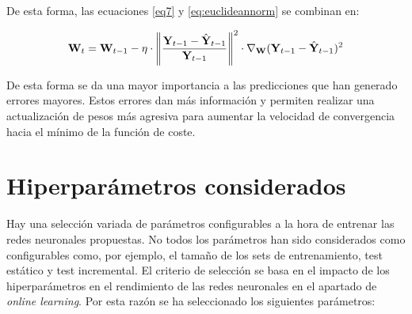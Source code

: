 De esta forma, las ecuaciones \ref{eq7} y \ref{eq:euclideannorm} se combinan en:

\begin{equation}
	\textbf{W}_t=\textbf{W}_{t-1}-\eta\cdot\norm{\frac{\textbf{Y}_{t-1}-\hat{\textbf{Y}}_{t-1}}{\textbf{Y}_{t-1}}}^2 \cdot \nabla_\textbf{W}(\textbf{Y}_{t-1}-\hat{\textbf{Y}}_{t-1})^2
\end{equation}

De esta forma se da una mayor importancia a las predicciones que han generado errores mayores. Estos errores dan más información y permiten realizar una actualización de pesos más agresiva para aumentar la velocidad de convergencia hacia el mínimo de la función de coste.

\section{Hiperparámetros considerados}
Hay una selección variada de parámetros configurables a la hora de entrenar las redes neuronales propuestas. No todos los parámetros han sido considerados como configurables como, por ejemplo, el tamaño de los sets de entrenamiento, test estático y test incremental. El criterio de selección se basa en el impacto de los hiperparámetros en el rendimiento de las redes neuronales en el apartado de \textit{online learning}. Por esta razón se ha seleccionado los siguientes parámetros:

